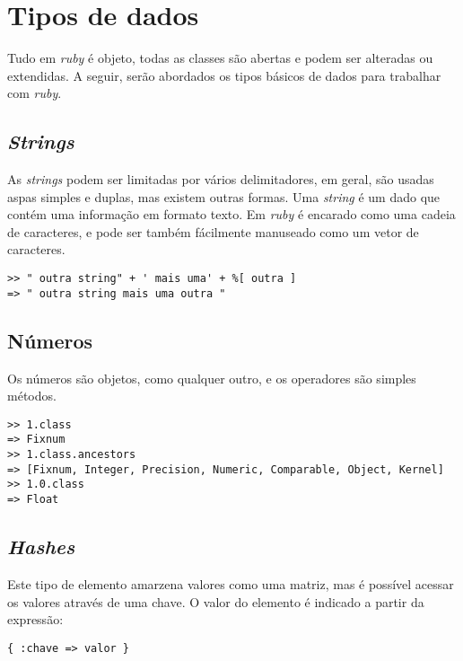 \documentclass[espaco=simples,appendix=Name]{abnt}
\begin{document}
\section { Tipos de dados }

Tudo em \textit{ruby} é objeto, todas as classes são abertas e podem ser alteradas ou extendidas. A seguir, serão abordados os tipos básicos de dados para trabalhar com \textit{ruby}.

\subsection { \textit{Strings} }

As \textit{strings} podem ser limitadas por vários delimitadores, em geral, são usadas aspas simples e duplas, mas existem outras formas. Uma \textit{string} é um dado que contém uma informação em formato texto. Em \textit{ruby} é encarado como uma cadeia de caracteres, e pode ser também fácilmente manuseado como um vetor de caracteres.

\begin{lstlisting}[caption=Exemplos de uso de \textit{string}]
>> " outra string" + ' mais uma' + %[ outra ]
=> " outra string mais uma outra "
\end{lstlisting}

\subsection { Números }

Os números são objetos, como qualquer outro, e os operadores são simples métodos.

\begin{lstlisting}[caption=Exemplos de uso de números ]
>> 1.class
=> Fixnum
>> 1.class.ancestors
=> [Fixnum, Integer, Precision, Numeric, Comparable, Object, Kernel]
>> 1.0.class
=> Float
\end{lstlisting}

\subsection { \textit{Hashes} }

Este tipo de elemento amarzena valores como uma matriz, mas é possível acessar os valores através de uma chave. O valor do elemento é indicado a partir da expressão:

\begin{lstlisting}[caption=Syntaxe do hash]
{ :chave => valor }
\end{lstlisting}
\end{document}
